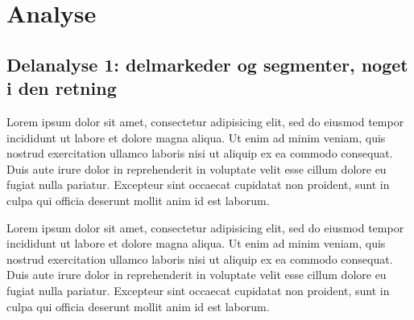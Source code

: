 
\part{Analyse\label{part_analyse}}


\chapter{Delanalyse 1: delmarkeder og segmenter, noget i den retning \label{analyse_deskriptivt}}

Lorem ipsum dolor sit amet, consectetur adipisicing elit, sed do eiusmod
tempor incididunt ut labore et dolore magna aliqua. Ut enim ad minim veniam,
quis nostrud exercitation ullamco laboris nisi ut aliquip ex ea commodo
consequat. Duis aute irure dolor in reprehenderit in voluptate velit esse
cillum dolore eu fugiat nulla pariatur. Excepteur sint occaecat cupidatat non
proident, sunt in culpa qui officia deserunt mollit anim id est laborum.

Lorem ipsum dolor sit amet, consectetur adipisicing elit, sed do eiusmod
tempor incididunt ut labore et dolore magna aliqua. Ut enim ad minim veniam,
quis nostrud exercitation ullamco laboris nisi ut aliquip ex ea commodo
consequat. Duis aute irure dolor in reprehenderit in voluptate velit esse
cillum dolore eu fugiat nulla pariatur. Excepteur sint occaecat cupidatat non
proident, sunt in culpa qui officia deserunt mollit anim id est laborum.

	
	





